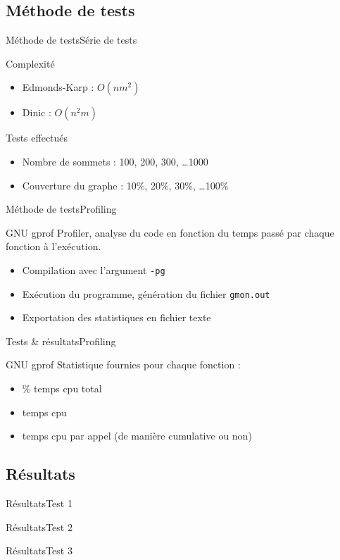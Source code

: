 \subsection{Méthode de tests}
\begin{frame}{Méthode de tests}{Série de tests}
\begin{block}{Complexité}
  \begin{itemize}
    \item Edmonds-Karp : $O(nm^2)$
    \item Dinic : $O(n^2m)$
  \end{itemize}
\end{block}
\begin{block}{Tests effectués}
  \begin{itemize}
    \item Nombre de sommets : 100, 200, 300, \ldots 1000
    \item Couverture du graphe : 10\%, 20\%, 30\%, \ldots 100\%
  \end{itemize}
\end{block}
\end{frame}

\begin{frame}{Méthode de tests}{Profiling}
\begin{block}{GNU gprof}
Profiler, analyse du code en fonction du temps passé par chaque fonction à l’exécution.
\begin{itemize}
\item Compilation avec l'argument \texttt{-pg}
\item Exécution du programme, génération du fichier \texttt{gmon.out}
\item Exportation des statistiques en fichier texte
\end{itemize}
\end{block}
\end{frame}

\begin{frame}{Tests \& résultats}{Profiling}
\begin{block}{GNU gprof}
Statistique fournies pour chaque fonction :
\begin{itemize}
\item \% temps cpu total
\item temps cpu
\item temps cpu par appel (de manière cumulative ou non)
\end{itemize}
\end{block}
\end{frame}

\subsection{Résultats}
\begin{frame}{Résultats}{Test 1}
\end{frame}
\begin{frame}{Résultats}{Test 2}
\end{frame}
\begin{frame}{Résultats}{Test 3}
\end{frame}